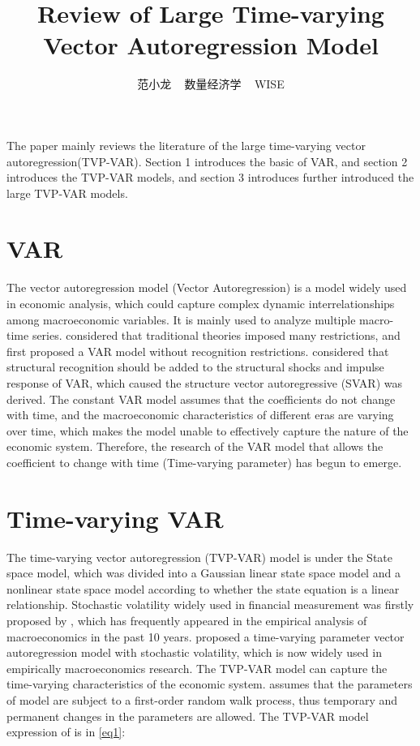 \documentclass[11pt]{article}
\title{Review of Large Time-varying Vector Autoregression Model}
\author{范小龙 ~ 数量经济学 ~ WISE}
\affil{ID: 27720201153473 \\ \email{fanxiaolong98@gmail.com} }
\begin{document}
\maketitle

The paper mainly reviews the literature of the large time-varying vector autoregression(TVP-VAR).
Section 1 introduces the basic of VAR, and section 2 introduces the TVP-VAR models, 
and section 3 introduces further introduced the large TVP-VAR models.


\section{VAR}

The vector autoregression model (Vector Autoregression) is a model widely used in economic analysis,
which could capture complex dynamic interrelationships among macroeconomic variables.
It is mainly used to analyze multiple macro-time series.
\cite{sims1980macroeconomics} considered that traditional theories imposed many restrictions,
and first proposed a VAR model without recognition restrictions. 
\cite{cooley1985atheoretical} considered that structural recognition should be added to the structural shocks and impulse response of VAR, 
which caused the structure vector autoregressive (SVAR) was derived.
The constant VAR model assumes that the coefficients do not change with time, and the macroeconomic characteristics of different eras are varying over time, 
which makes the model unable to effectively capture the nature of the economic system. 
Therefore, the research of the VAR model that allows the coefficient to change with time (Time-varying parameter) has begun to emerge.



\section{Time-varying VAR} 

The time-varying vector autoregression (TVP-VAR) model is under the State space model, which was divided into a Gaussian 
linear state space model and a nonlinear state space model 
according to whether the state equation is a linear relationship.
Stochastic volatility widely used in financial measurement  was firstly proposed by \cite{black1976pricing},
which has frequently appeared in the empirical analysis of macroeconomics in the past 10 years.
\cite{primiceri2005time} proposed a time-varying parameter vector autoregression model with stochastic volatility, 
which is now widely used in empirically macroeconomics research.
The TVP-VAR model can capture the time-varying characteristics of the economic system. 
\cite{primiceri2005time} assumes that the  parameters of model are subject to a first-order random walk process, 
thus temporary and permanent changes in the parameters are allowed.
The TVP-VAR model expression of \cite{primiceri2005time} is in \eqref{eq1}:
\end{document}
